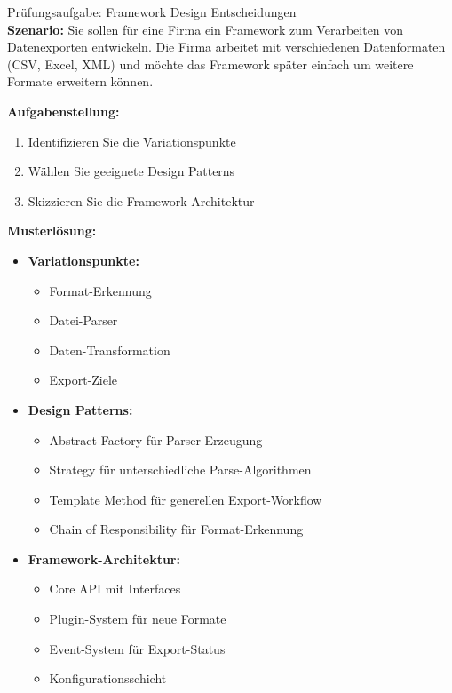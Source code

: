 \begin{example2}{Prüfungsaufgabe: Framework Design Entscheidungen}\\
\textbf{Szenario:}
Sie sollen für eine Firma ein Framework zum Verarbeiten von Datenexporten entwickeln.
Die Firma arbeitet mit verschiedenen Datenformaten (CSV, Excel, XML) und möchte das 
Framework später einfach um weitere Formate erweitern können.

\textbf{Aufgabenstellung:}
\begin{enumerate}
    \item Identifizieren Sie die Variationspunkte
    \item Wählen Sie geeignete Design Patterns
    \item Skizzieren Sie die Framework-Architektur
\end{enumerate}

\textbf{Musterlösung:}
\begin{itemize}
    \item \textbf{Variationspunkte:}
    \begin{itemize}
        \item Format-Erkennung
        \item Datei-Parser
        \item Daten-Transformation
        \item Export-Ziele
    \end{itemize}
    
    \item \textbf{Design Patterns:}
    \begin{itemize}
        \item Abstract Factory für Parser-Erzeugung
        \item Strategy für unterschiedliche Parse-Algorithmen
        \item Template Method für generellen Export-Workflow
        \item Chain of Responsibility für Format-Erkennung
    \end{itemize}
    
    \item \textbf{Framework-Architektur:}
    \begin{itemize}
        \item Core API mit Interfaces
        \item Plugin-System für neue Formate
        \item Event-System für Export-Status
        \item Konfigurationsschicht
    \end{itemize}
\end{itemize}
\end{example2}

